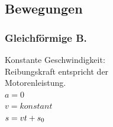 \subsection{Bewegungen}
\begin{multicols}{3}
	\subsubsection{Gleichförmige B.}
	Konstante Geschwindigkeit: \\
	Reibungskraft entspricht der \\
	Motorenleistung. \\
	$a = 0$ \\
	$v = konstant$\\
	$s = vt + s\textsubscript{0}$ \\
	\\
	\\
\columnbreak

\end{multicols}
